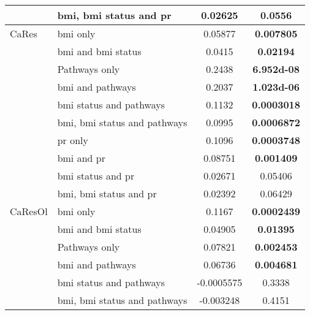 \begin{ThreePartTable}
\begin{longtable}{llcc}
		                                  & \gls{bmi}, \gls{bmi} status and \gls{pr} & 0.02625    & 0.0556    \\
				\hline
				\rule{0pt}{2.25ex}CaRes   & \gls{bmi} only                           & 0.05877    & \bfseries 0.007805  \\
		                                  & \gls{bmi} and \gls{bmi} status           & 0.0415     & \bfseries 0.02194   \\
		                                  & Pathways only                            & 0.2438     & \bfseries \num{6.952d-08} \\
		                                  & \gls{bmi} and pathways                   & 0.2037     & \bfseries \num{1.023d-06} \\
		                                  & \gls{bmi} status and pathways            & 0.1132     & \bfseries 0.0003018 \\
		                                  & \gls{bmi}, \gls{bmi} status and pathways & 0.0995     & \bfseries 0.0006872 \\
		                                  & \gls{pr} only                            & 0.1096     & \bfseries 0.0003748 \\
		                                  & \gls{bmi} and \gls{pr}                   & 0.08751    & \bfseries 0.001409  \\
		                                  & \gls{bmi} status and \gls{pr}            & 0.02671    & 0.05406   \\
		                                  & \gls{bmi}, \gls{bmi} status and \gls{pr} & 0.02392    & 0.06429   \\
				\hline
				\rule{0pt}{2.25ex}CaResOl & \gls{bmi} only                           & 0.1167     & \bfseries 0.0002439 \\
		                                  & \gls{bmi} and \gls{bmi} status           & 0.04905    & \bfseries 0.01395   \\
		                                  & Pathways only                            & 0.07821    & \bfseries 0.002453  \\
		                                  & \gls{bmi} and pathways                   & 0.06736    & \bfseries 0.004681  \\
		                                  & \gls{bmi} status and pathways            & -0.0005575 & 0.3338    \\
		                                  & \gls{bmi}, \gls{bmi} status and pathways & -0.003248  & 0.4151    \\

\end{longtable}
\end{ThreePartTable}
